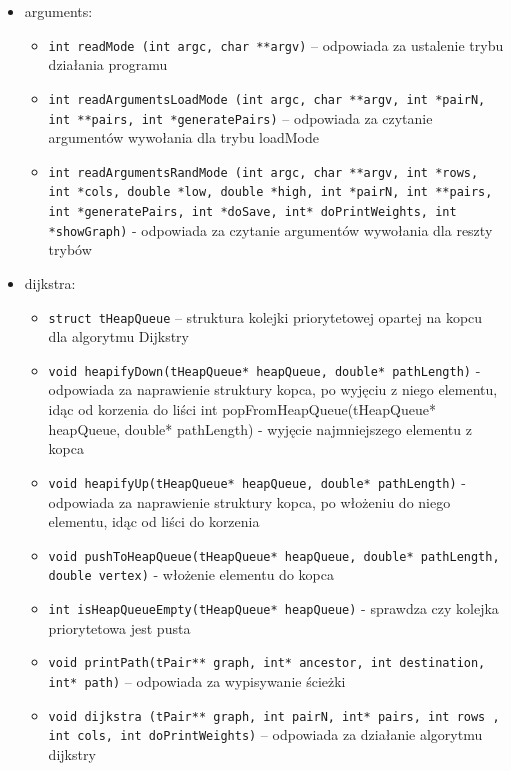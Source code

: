 \documentclass{article}
\begin{document}
\begin{itemize}
\begin{itemize}
    \end{itemize}
\item arguments:
    \begin{itemize}
    \item \texttt{\footnotesize int readMode (int argc, char **argv)} – odpowiada za ustalenie trybu działania programu
    \item \texttt{\footnotesize int readArgumentsLoadMode (int argc, char **argv, int *pairN, int **pairs, int *generatePairs)} – odpowiada za czytanie argumentów wywołania dla trybu loadMode
    \item \texttt{\footnotesize int readArgumentsRandMode (int argc, char **argv, int *rows, int *cols, double *low, double *high, int *pairN, int **pairs, int *generatePairs, int *doSave, int* doPrintWeights, int *showGraph)} - odpowiada za czytanie argumentów wywołania dla reszty trybów
    \end{itemize}
\item dijkstra:
    \begin{itemize}
    \item \texttt{\footnotesize struct tHeapQueue} – struktura kolejki priorytetowej opartej na kopcu dla algorytmu Dijkstry
    \item \texttt{\footnotesize void heapifyDown(tHeapQueue* heapQueue, double* pathLength)} - odpowiada za naprawienie struktury kopca, po wyjęciu z niego elementu, idąc od korzenia do liści
    int popFromHeapQueue(tHeapQueue* heapQueue, double* pathLength) - wyjęcie najmniejszego elementu z kopca 
    \item \texttt{\footnotesize void heapifyUp(tHeapQueue* heapQueue, double* pathLength)} - odpowiada za naprawienie struktury kopca, po włożeniu do niego elementu, idąc od liści do korzenia
    \item \texttt{\footnotesize void pushToHeapQueue(tHeapQueue* heapQueue, double* pathLength, double vertex)} - włożenie elementu do kopca
    \item \texttt{\footnotesize int isHeapQueueEmpty(tHeapQueue* heapQueue)} - sprawdza czy kolejka priorytetowa jest pusta
    \item \texttt{\footnotesize void printPath(tPair** graph, int* ancestor, int destination, int* path)} – odpowiada za wypisywanie ścieżki
    \item \texttt{\footnotesize void dijkstra (tPair** graph, int pairN, int* pairs, int rows , int cols, int doPrintWeights)} – odpowiada za działanie algorytmu dijkstry
    \end{itemize}


\end{itemize}
\end{document}
